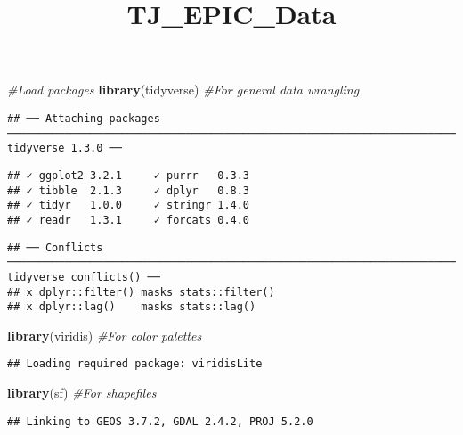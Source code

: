 \documentclass[]{article}
\title{TJ\_EPIC\_Data}
\author{}
\date{\vspace{-2.5em}}
\newenvironment{Shaded}{\begin{snugshade}}{\end{snugshade}}
\newcommand{\CommentTok}[1]{\textcolor[rgb]{0.56,0.35,0.01}{\textit{#1}}}
\newcommand{\KeywordTok}[1]{\textcolor[rgb]{0.13,0.29,0.53}{\textbf{#1}}}
\newcommand{\NormalTok}[1]{#1}
\begin{document}
\maketitle

\begin{Shaded}
\begin{Highlighting}[]
\CommentTok{#Load packages}
\KeywordTok{library}\NormalTok{(tidyverse) }\CommentTok{#For general data wrangling}
\end{Highlighting}
\end{Shaded}

\begin{verbatim}
## ── Attaching packages ──────────────────────────────────────────────────────────────────────────────── tidyverse 1.3.0 ──
\end{verbatim}

\begin{verbatim}
## ✓ ggplot2 3.2.1     ✓ purrr   0.3.3
## ✓ tibble  2.1.3     ✓ dplyr   0.8.3
## ✓ tidyr   1.0.0     ✓ stringr 1.4.0
## ✓ readr   1.3.1     ✓ forcats 0.4.0
\end{verbatim}

\begin{verbatim}
## ── Conflicts ─────────────────────────────────────────────────────────────────────────────────── tidyverse_conflicts() ──
## x dplyr::filter() masks stats::filter()
## x dplyr::lag()    masks stats::lag()
\end{verbatim}

\begin{Shaded}
\begin{Highlighting}[]
\KeywordTok{library}\NormalTok{(viridis) }\CommentTok{#For color palettes}
\end{Highlighting}
\end{Shaded}

\begin{verbatim}
## Loading required package: viridisLite
\end{verbatim}

\begin{Shaded}
\begin{Highlighting}[]
\KeywordTok{library}\NormalTok{(sf) }\CommentTok{#For shapefiles}
\end{Highlighting}
\end{Shaded}

\begin{verbatim}
## Linking to GEOS 3.7.2, GDAL 2.4.2, PROJ 5.2.0
\end{verbatim}
\end{document}
